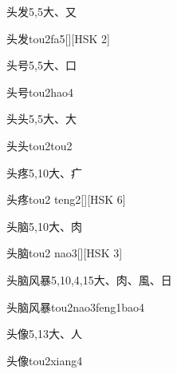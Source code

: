 \begin{Entry}{头发}{5,5}{⼤、⼜}
  \begin{Phonetics}{头发}{tou2fa5}[][HSK 2]
  \end{Phonetics}
\end{Entry}

\begin{Entry}{头号}{5,5}{⼤、⼝}
  \begin{Phonetics}{头号}{tou2hao4}
  \end{Phonetics}
\end{Entry}

\begin{Entry}{头头}{5,5}{⼤、⼤}
  \begin{Phonetics}{头头}{tou2tou2}
  \end{Phonetics}
\end{Entry}

\begin{Entry}{头疼}{5,10}{⼤、⽧}
  \begin{Phonetics}{头疼}{tou2 teng2}[][HSK 6]
  \end{Phonetics}
\end{Entry}

\begin{Entry}{头脑}{5,10}{⼤、⾁}
  \begin{Phonetics}{头脑}{tou2 nao3}[][HSK 3]
  \end{Phonetics}
\end{Entry}

\begin{Entry}{头脑风暴}{5,10,4,15}{⼤、⾁、⾵、⽇}
  \begin{Phonetics}{头脑风暴}{tou2nao3feng1bao4}
  \end{Phonetics}
\end{Entry}

\begin{Entry}{头像}{5,13}{⼤、⼈}
  \begin{Phonetics}{头像}{tou2xiang4}
  \end{Phonetics}
\end{Entry}

